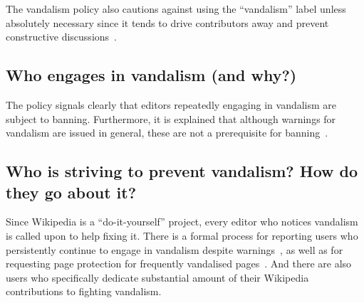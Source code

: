 The vandalism policy also cautions against using the ``vandalism'' label unless absolutely necessary since it tends to drive contributors away and prevent constructive discussions~\cite{Wikipedia:Vandalism}.

\begin{comment}
\url{https://en.wikipedia.org/wiki/Wikipedia:Vandalism}
"Careful consideration may be required to differentiate between edits that are beneficial, edits that are detrimental but well-intentioned, and edits that are vandalism."

\url{https://en.wikipedia.org/wiki/Wikipedia:Disruptive_editing}

"Disruptive editing is not always intentional. Editors may be accidentally disruptive because they don't understand how to correctly edit, or because they lack the social skills or competence necessary to work collaboratively "
Okay what are disruptive edits that are not vandalism? (apart from edit wars)

"Engages in "disruptive cite-tagging"; adds unjustified {{citation needed}} tags to an article when the content tagged is already sourced, uses such tags to suggest that properly sourced article content is questionable."
\end{comment}

\subsection{Who engages in vandalism (and why?)}

The policy signals clearly that editors repeatedly engaging in vandalism are subject to banning.
Furthermore, it is explained that although warnings for vandalism are issued in general, these are not a prerequisite for banning~\cite{Wikipedia:Vandalism}.

\subsection{Who is striving to prevent vandalism? How do they go about it?}

Since Wikipedia is a ``do-it-yourself'' project, every editor who notices vandalism is called upon to help fixing it.
There is a formal process for reporting users who persistently continue to engage in vandalism despite warnings~\cite{Wikipedia:AIV}, %
as well as for requesting page protection for frequently vandalised pages~\cite{Wikipedia:PageProtection}.
And there are also users who specifically dedicate substantial amount of their Wikipedia contributions to fighting vandalism.

